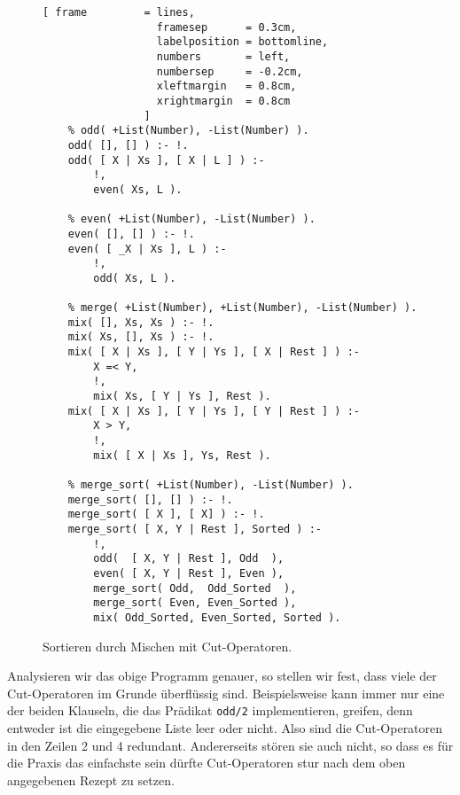 \begin{figure}[!h]
  \centering
\begin{Verbatim}[ frame         = lines, 
                  framesep      = 0.3cm, 
                  labelposition = bottomline,
                  numbers       = left,
                  numbersep     = -0.2cm,
                  xleftmargin   = 0.8cm,
                  xrightmargin  = 0.8cm
                ]
    % odd( +List(Number), -List(Number) ).    
    odd( [], [] ) :- !.    
    odd( [ X | Xs ], [ X | L ] ) :-
        !,
        even( Xs, L ).

    % even( +List(Number), -List(Number) ).
    even( [], [] ) :- !.
    even( [ _X | Xs ], L ) :-
        !,
        odd( Xs, L ).
    
    % merge( +List(Number), +List(Number), -List(Number) ).
    mix( [], Xs, Xs ) :- !.    
    mix( Xs, [], Xs ) :- !.
    mix( [ X | Xs ], [ Y | Ys ], [ X | Rest ] ) :-
        X =< Y,
        !,
        mix( Xs, [ Y | Ys ], Rest ).
    mix( [ X | Xs ], [ Y | Ys ], [ Y | Rest ] ) :-
        X > Y,
        !,
        mix( [ X | Xs ], Ys, Rest ).
    
    % merge_sort( +List(Number), -List(Number) ).
    merge_sort( [], [] ) :- !.
    merge_sort( [ X ], [ X] ) :- !.
    merge_sort( [ X, Y | Rest ], Sorted ) :-
        !,
        odd(  [ X, Y | Rest ], Odd  ),
        even( [ X, Y | Rest ], Even ),
        merge_sort( Odd,  Odd_Sorted  ),
        merge_sort( Even, Even_Sorted ),
        mix( Odd_Sorted, Even_Sorted, Sorted ).
\end{Verbatim}
\vspace*{-0.3cm}
  \caption{Sortieren durch Mischen mit Cut-Operatoren.}
  \label{fig:merge-sort-cut}
\end{figure}

Analysieren wir das obige Programm genauer, so stellen wir fest, dass viele der
Cut-Operatoren im Grunde überflüssig sind.  Beispielsweise kann immer nur eine der beiden
Klauseln, die das Prädikat \texttt{odd/2} implementieren, greifen, denn entweder ist die
eingegebene Liste leer oder nicht.  Also sind die Cut-Operatoren in den Zeilen 2 und 4
redundant.  Andererseits stören sie auch nicht, so dass es für die Praxis das einfachste
sein dürfte Cut-Operatoren stur nach dem oben angegebenen Rezept zu setzen.
\pagebreak

\vspace*{\fill}

